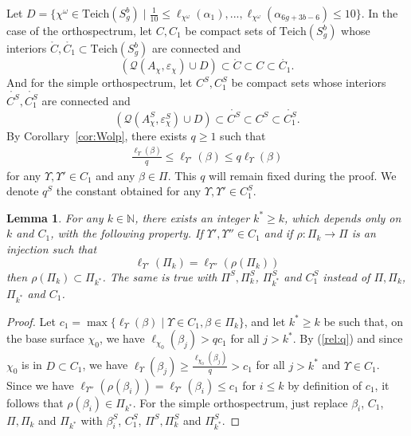\documentclass[a4paper,12pt]{article}
\newtheorem{lemme}[theorem]{Lemma}
\theoremstyle{definition}
\theoremstyle{remark}
\begin{document}

Let $D = \{ \chi^{\omega} \in \mathrm{Teich}(S_g^b) \mid  \frac{1}{10} \leqslant \ell _{\chi^{\omega}}(\alpha_1),...,\ell_{\chi^{\omega}} (\alpha_{6g+3b-6}) \leqslant 10 \} $. In the case of the orthospectrum, let $C, C_1$ be compact sets of $\mathrm{Teich}(S_g^b)$ whose interiors $\mathring{C}, \mathring{C_1} \subset \mathrm{Teich}(S_g^b)$ are connected and
\[
    ( \mathcal{Q}(A_\chi, \varepsilon_\chi) \cup D ) \subset \mathring{C} \subset C \subset \mathring{C_1}.
\]
And for the simple orthospectrum, let $C^S, C_1^S$ be compact sets whose interiors $\mathring{C^S}, \mathring{C_1^S}$ are connected and
\[
    ( \mathcal{Q}(A_\chi^S, \varepsilon_\chi^S) \cup D ) \subset \mathring{C^S} \subset C^S \subset \mathring{C_1^S}.
\]
By Corollary~\ref{cor:Wolp}, there exists $q \geqslant 1$ such that 
\begin{align}
   \frac{\ell_{\Upsilon} (\beta)}{q}  \leqslant \ell_{\Upsilon'} (\beta) \leqslant q \ell_{\Upsilon} (\beta)\label{rel:q} 
\end{align}
for any $\Upsilon, \Upsilon' \in C_1$ and any $\beta \in \Pi$. This $q$ will remain fixed during the proof. We denote $q^S$ the constant obtained for any $\Upsilon, \Upsilon' \in C_1^S$.


\begin{lemme}\label{lem:rho}
    For any $k \in \mathbb{N} $, there exists an integer $k^* \geqslant k $, which depends only on $k$ and $C_1$, with the following property. If $\Upsilon', \Upsilon'' \in C_1$ and if $\rho : \Pi_k \to \Pi$ is an injection such that
    \[
        \ell_{\Upsilon'} (\Pi_k) = \ell_{\Upsilon''}(\rho (\Pi_k))
    \]
    then $\rho(\Pi_k) \subset \Pi_{k^*}$.
    The same is true with $\Pi^S, \Pi_k^S$, $\Pi_{k^*}^S$ and $C_1^S$ instead of $\Pi, \Pi_k$, $\Pi_{k^*}$ and $C_1$.
\end{lemme}


\begin{proof}
    Let $c_1=\max\{ \ell_{\Upsilon} (\beta) \mid  \Upsilon \in C_1, \beta \in \Pi_k \} $, and let $k^* \geqslant k$ be such that, on the base surface $\chi_0$, we have $\ell_{\chi_0} (\beta_j) > q c_1$ for all $j > k^*$. By (\ref{rel:q}) and since $\chi_0$ is in $D \subset C_1$, we have $ \ell_{\Upsilon} (\beta_j) \geqslant \frac{\ell_{\chi_0} (\beta_j)}{q} > c_1 $ for all $j>k^*$ and $\Upsilon \in C_1$. Since we have $\ell_{\Upsilon''} (\rho (\beta_i))=\ell_{\Upsilon'} (\beta_i) \leqslant c_1$ for $ i \leqslant k$ by definition of $c_1$, it follows that $\rho (\beta_i) \in \Pi_{k^*}$. For the simple orthospectrum, just replace $\beta_i$, $C_1$, $\Pi, \Pi_k$ and $\Pi_{k^*}$ with $\beta_i^S$, $C_1^S$,  $\Pi^S, \Pi_k^S$ and $\Pi_{k^*}^S$. 
\end{proof}
\end{document}

